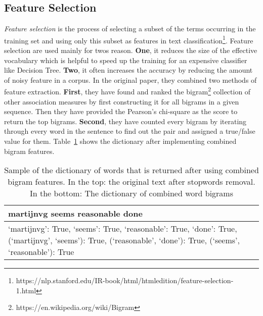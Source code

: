 \subsection{Feature Selection}  
\emph{Feature selection} is the process of selecting a subset of the terms occurring in the training set and using only this subset as features in text classification\footnote{https://nlp.stanford.edu/IR-book/html/htmledition/feature-selection-1.html}. Feature selection are used mainly for twos reason. \noindent\textbf{One}, it reduces the size of the effective vocabulary which is helpful to speed up the training for an expensive classifier like Decision Tree. \noindent\textbf{Two}, it often increases the accuracy by reducing the amount of noisy feature in a corpus. In the original paper, they combined two methods of feature extraction. \noindent\textbf{First}, they have found and ranked the bigram\footnote{https://en.wikipedia.org/wiki/Bigram} collection of other association measures by first constructing it for all bigrams in a given sequence. Then they have provided the Pearson's chi-square as the score to return the top bigrams. \noindent\textbf{Second}, they have counted every bigram by iterating through every word in the sentence to find out the pair and assigned a true/false value for them. Table~\ref{tbl:feature_selection} shows the dictionary after implementing combined bigram features.
  \begin{table}
	\caption{Sample of the dictionary of words that is returned after using combined bigram features. In the top: the original text after stopwords removal. In the bottom: The dictionary of combined word bigrams}
	\begin{tabular}{ p{3.25in}}
		\toprule
		martijnvg seems reasonable done \\
		\midrule
		{`martijnvg': True, `seems': True, `reasonable': True, `done': True, (`martijnvg', `seems'): True, (`reasonable', `done'): True, (`seems', `reasonable'): True} \\
		\bottomrule
		
	\end{tabular}
	\label{tbl:feature_selection}
\end{table}

